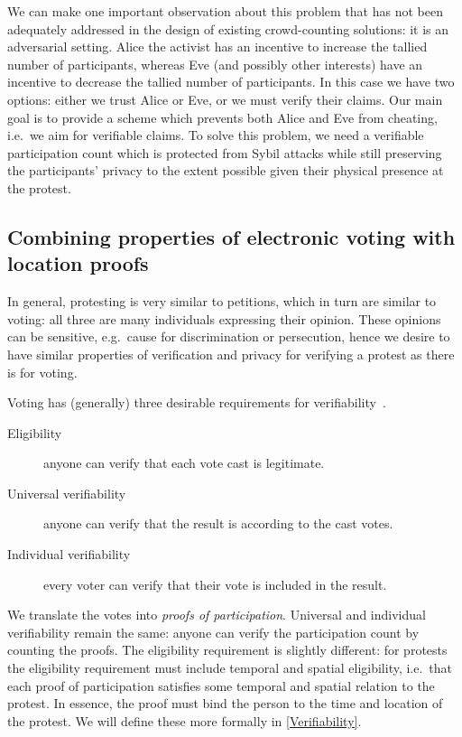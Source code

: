 We can make one important observation about this problem that has not
been adequately addressed in the design of existing crowd-counting solutions: it is an adversarial setting.
Alice the activist has an incentive to increase the tallied number of 
participants, whereas Eve (and possibly other interests) have an incentive to 
decrease the tallied number of participants.
In this case we have two options:
either we trust Alice or Eve, or we must verify their claims.
Our main goal is to provide a scheme which prevents both Alice and Eve from 
cheating, i.e.\ we aim for verifiable claims.
To solve this problem, we need a verifiable participation count which is 
protected from Sybil attacks while still preserving the participants'
privacy to the extent possible given their physical presence at the protest.

\subsection{Combining properties of electronic voting with location proofs}

In general, protesting is very similar to petitions, which in turn are similar 
to voting: all three are many individuals expressing their opinion.
These opinions can be sensitive, e.g.\ cause for discrimination or persecution, 
hence we desire to have similar properties of verification and privacy for 
verifying a protest as there is for voting.

Voting has (generally) three desirable requirements for 
verifiability~\cite{VerifyingPrivacyPropertiesOfVotingProtocols}.
\begin{description}
  \item[Eligibility] anyone can verify that each vote cast is legitimate.
  \item[Universal verifiability] anyone can verify that the result is according 
    to the cast votes.
  \item[Individual verifiability] every voter can verify that their vote is 
    included in the result.
\end{description}
We translate the votes into \emph{proofs of participation}.
Universal and individual verifiability remain the same: anyone can verify the 
participation count by counting the proofs.
The eligibility requirement is slightly different:
for protests the eligibility requirement must include temporal and spatial 
eligibility, i.e.\ that each proof of participation satisfies some temporal and 
spatial relation to the protest.
In essence, the proof must bind the person to the time and location of the 
protest.
We will define these more formally in \cref{Verifiability}.

